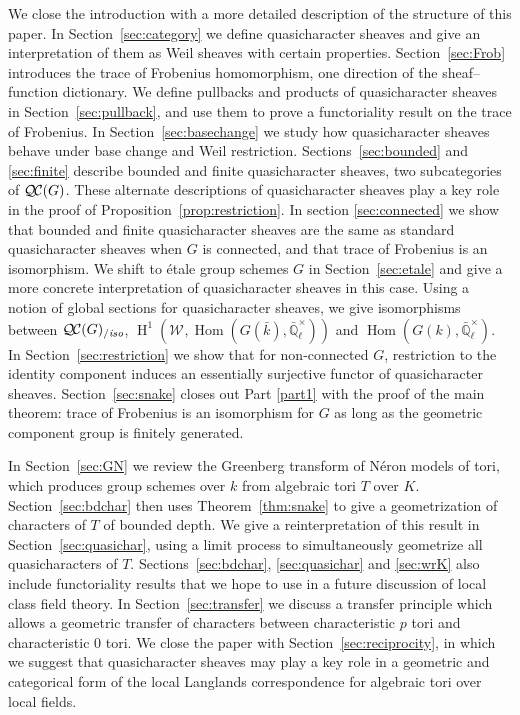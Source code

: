\documentclass[11pt]{amsart}
\theoremstyle{plain}
\theoremstyle{definition}
\theoremstyle{remark}
\newcommand{\EE}{\mathbb{\bar Q}_\ell}
\newcommand{\bFq}{\bar{k}}
\newcommand{\Fq}{k}
\newcommand{\EEx}{\EE^\times}
\DeclareMathOperator{\Hom}{Hom}
\DeclareMathOperator{\Hh}{H}
\newcommand{\QC}{{\mathcal{Q\hskip-0.8pt C}}}
\newcommand{\QCiso}[1]{\QC(#1)_{/\textit{iso}}}
\newcommand{\Weil}[1]{\mathcal{W}_{#1}}
\begin{document}
We close the introduction with a more detailed description of the structure of this paper.
In Section~\ref{sec:category} we define quasicharacter sheaves and give an interpretation of
them as Weil sheaves with certain properties.
Section~\ref{sec:Frob} introduces the trace of Frobenius homomorphism,
one direction of the sheaf--function dictionary.
We define pullbacks and products of quasicharacter sheaves in Section~\ref{sec:pullback}, and use
them to prove a functoriality result on the trace of Frobenius.
In Section~\ref{sec:basechange} we study how quasicharacter sheaves behave under base change
and Weil restriction.
Sections~\ref{sec:bounded} and \ref{sec:finite} describe bounded and finite quasicharacter sheaves,
two subcategories of $\QC(G)$.  These alternate descriptions of quasicharacter sheaves play a key
role in the proof of Proposition~\ref{prop:restriction}.
In section \ref{sec:connected} we show that bounded and finite quasicharacter sheaves are the same
as standard quasicharacter sheaves when $G$ is connected, and that trace of Frobenius is an isomorphism.
We shift to \'etale group schemes $G$ in Section~\ref{sec:etale} and give a more concrete interpretation
of quasicharacter sheaves in this case.  Using a notion of global sections for quasicharacter sheaves,
we give isomorphisms between $\QCiso{G}$, $\Hh^1(\Weil{}, \Hom(G(\bFq), \EEx))$ and $\Hom(G(\Fq), \EEx)$.
In Section~\ref{sec:restriction} we show that for non-connected $G$, restriction to the identity component
induces an essentially surjective functor of quasicharacter sheaves.
Section~\ref{sec:snake} closes out Part \ref{part1} with the proof of the main theorem: trace of Frobenius
is an isomorphism for $G$ as long as the geometric component group is finitely generated.

In Section~\ref{sec:GN} we review the Greenberg transform of N\'eron models of tori, which produces
group schemes over $\Fq$ from algebraic tori $T$ over $K$.
Section~\ref{sec:bdchar} then uses Theorem~\ref{thm:snake} to give a geometrization of characters of $T$
of bounded depth.
We give a reinterpretation of this result in Section~\ref{sec:quasichar}, using a limit process to simultaneously
geometrize all quasicharacters of $T$.  Sections~\ref{sec:bdchar}, \ref{sec:quasichar} and \ref{sec:wrK} also include
functoriality results that we hope to use in a future discussion of 
local class field theory.
In Section~\ref{sec:transfer} we discuss a transfer principle which allows
a geometric transfer of characters between characteristic $p$ tori and characteristic $0$ tori.
We close the paper with Section~\ref{sec:reciprocity}, in which we suggest that quasicharacter
sheaves may play a key role in a geometric and categorical form of the local Langlands
correspondence for algebraic tori over local fields.
\end{document}

